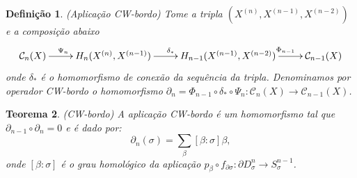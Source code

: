 \documentclass[12pt]{book}
\newtheorem{teorema}{Teorema}[section]
\newtheorem{definicao}[teorema]{Definição}
\newcommand{\celulabordo}[2]{\partial D^{#1}_{#2}}
\newcommand{\homologiarelskele}[3]{H_{#1}(X^{(#2)}, X^{(#3)})}
\newcommand{\homologiarelskelesimpl}[2]{H_{#1}(X^{(#2)}, X^{(#2-1)})}
\newcommand{\skeleton}[1]{X^{(#1)}}
\begin{document}
	\begin{definicao}
		(Aplicação CW-bordo) Tome a tripla $(\skeleton{n}, \skeleton{n-1}, \skeleton{n-2})$ e a composição abaixo
		\[
		\xymatrix{
			\mathcal{C}_{n}(X) \ar[r]^{\Psi_{n}\qquad} &
			\homologiarelskelesimpl{n}{n} \ar[r]^{\delta_{*}} & 
			\homologiarelskele{n-1}{n-1}{n-2} \ar[r]^{\qquad \Phi_{n-1}}&
			\mathcal{C}_{n-1}(X)
		}
		\]
		onde $\delta_{*}$ é o homomorfismo de conexão da sequência da tripla. Denominamos por operador CW-bordo o homomorfismo $\partial_{n} = \Phi_{n-1} \circ \delta_{*} \circ \Psi_{n} : \mathcal{C}_{n}(X) \to \mathcal{C}_{n-1}(X)$.
	\end{definicao}
	
	\begin{teorema}
		(CW-bordo) A aplicação CW-bordo é um homomorfismo tal que $\partial_{n-1}\circ\partial_{n} = 0$ e é dado por:
		$$
		\partial_{n}(\sigma) = \sum_{\beta}[\beta:\sigma]\beta,
		$$
		onde $[\beta:\sigma]$ é o grau homológico da aplicação $p_{\beta} \circ f_{\partial\sigma}:\celulabordo{n}{\sigma} \to S^{n-1}_{\sigma}$.
	\end{teorema}
\end{document}
